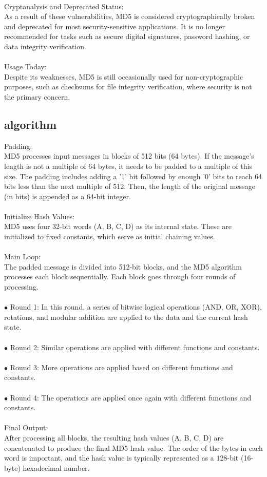 \documentclass{report}
\begin{document}
\\
Cryptanalysis and Deprecated Status:\\
 As a result of these vulnerabilities, MD5 is considered cryptographically broken and deprecated for most security-sensitive applications. It is no longer recommended for tasks such as secure digital signatures, password hashing, or data integrity verification.\\
\\
Usage Today: \\
Despite its weaknesses, MD5 is still occasionally used for non-cryptographic purposes, such as checksums for file integrity verification, where security is not the primary concern.

\subsection{algorithm}

    Padding:\\
     MD5 processes input messages in blocks of 512 bits (64 bytes). If the message's length is not a multiple of 64 bytes, it needs to be padded to a multiple of this size. The padding includes adding a '1' bit followed by enough '0' bits to reach 64 bits less than the next multiple of 512. Then, the length of the original message (in bits) is appended as a 64-bit integer.\\
\\
Initialize Hash Values:\\
 MD5 uses four 32-bit words (A, B, C, D) as its internal state. These are initialized to fixed constants, which serve as initial chaining values.\\
\\
Main Loop:\\
 The padded message is divided into 512-bit blocks, and the MD5 algorithm processes each block sequentially. Each block goes through four rounds of processing.\\
\\
$\bullet$ Round 1: In this round, a series of bitwise logical operations (AND, OR, XOR), rotations, and modular addition are applied to the data and the current hash state.\\
\\
$\bullet$ Round 2: Similar operations are applied with different functions and constants.\\
\\
$\bullet$ Round 3: More operations are applied based on different functions and constants.\\
\\
$\bullet$ Round 4: The operations are applied once again with different functions and constants.\\
\\
Final Output:\\
 After processing all blocks, the resulting hash values (A, B, C, D) are concatenated to produce the final MD5 hash value. The order of the bytes in each word is important, and the hash value is typically represented as a 128-bit (16-byte) hexadecimal number.
\end{document}
